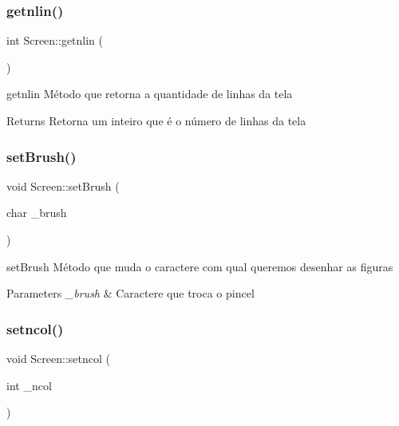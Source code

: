 \subsubsection{\texorpdfstring{getnlin()}{getnlin()}}
{\footnotesize\ttfamily int Screen\+::getnlin (\begin{DoxyParamCaption}{ }\end{DoxyParamCaption})}



getnlin Método que retorna a quantidade de linhas da tela 

\begin{DoxyReturn}{Returns}
Retorna um inteiro que é o número de linhas da tela 
\end{DoxyReturn}
\mbox{\label{class_screen_aebc4eb6cb5acf15a0f04c1494622ab23}} 
\subsubsection{\texorpdfstring{set\+Brush()}{setBrush()}}
{\footnotesize\ttfamily void Screen\+::set\+Brush (\begin{DoxyParamCaption}\item[{char}]{\+\_\+brush }\end{DoxyParamCaption})}



set\+Brush Método que muda o caractere com qual queremos desenhar as figuras 


\begin{DoxyParams}{Parameters}
{\em \+\_\+brush} & Caractere que troca o pincel \\
\hline
\end{DoxyParams}
\mbox{\label{class_screen_a07a26006fcf8b8169af511f1eff03a04}} 
\subsubsection{\texorpdfstring{setncol()}{setncol()}}
{\footnotesize\ttfamily void Screen\+::setncol (\begin{DoxyParamCaption}\item[{int}]{\+\_\+ncol }\end{DoxyParamCaption})}



